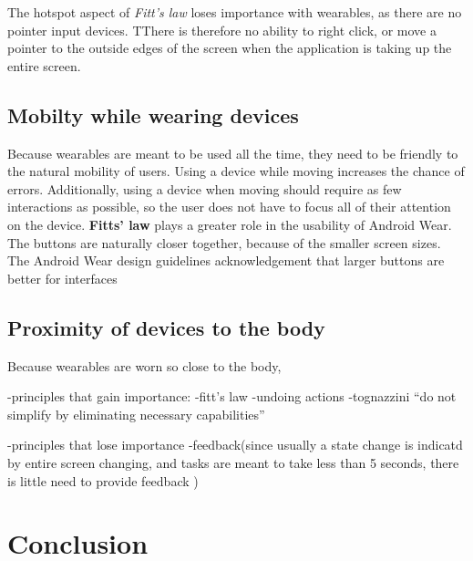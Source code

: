 \documentclass[12pt]{article}
\begin{document}
The hotspot aspect of \textit{Fitt's law} loses importance with wearables, as there are no pointer input devices. TThere is therefore no ability to right click, or move a pointer to the outside edges of the screen when the application is taking up the entire screen.

\subsection{Mobilty while wearing devices}
Because wearables are meant to be used all the time, they need to be friendly to the natural mobility of users. Using a device while moving increases the chance of errors. Additionally, using a device when moving should require as few interactions as possible, so the user does not have to focus all of their attention on the device.  \textbf{Fitts' law} plays a greater role in the usability of Android Wear. The buttons are naturally closer together, because of the smaller screen sizes. The Android Wear design guidelines acknowledgement that larger buttons are better for interfaces

\subsection{Proximity of devices to the body}
Because wearables are worn so close to the body,


-principles that gain importance:
	-fitt's law
	-undoing actions
	-tognazzini ``do not simplify by eliminating necessary capabilities''
	
-principles that lose importance
	-feedback(since usually a state change is indicatd by entire screen changing, and tasks are meant to take less than 5 seconds, there is little need to provide feedback )

\section{Conclusion}



\end{document}

